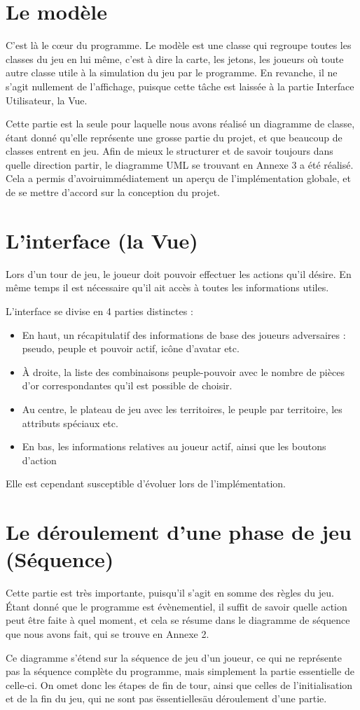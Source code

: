 \documentclass[a4paper]{report}
\begin{document}
\section{Le modèle}
\par
C'est là le cœur du programme. Le modèle est une classe qui regroupe toutes les
classes du jeu en lui même, c'est à dire la carte, les jetons, les joueurs où
toute autre classe utile à la simulation du jeu par le programme.  En revanche, il ne s'agit
nullement de l'affichage, puisque cette tâche est laissée à la
partie Interface Utilisateur, la Vue.
\par
Cette partie est la seule pour laquelle nous avons réalisé un diagramme de
classe, étant donné qu'elle représente une grosse partie du projet, et que
beaucoup de classes entrent en jeu. Afin de mieux le structurer et de
savoir toujours dans quelle direction partir, le diagramme UML se trouvant en
Annexe 3 a été réalisé. Cela a permis d'avoiruimmédiatement un aperçu de
l'implémentation globale, et de se mettre d'accord sur la conception du projet.
\section{L'interface (la Vue)}
Lors d'un tour de jeu, le joueur doit pouvoir effectuer les actions qu'il désire. En même temps il est nécessaire qu'il ait accès à toutes les informations utiles.
\par
L'interface se divise en 4 parties distinctes :
\begin{itemize}
\item En haut, un récapitulatif des informations de base des joueurs adversaires : pseudo, peuple et pouvoir actif, icône d'avatar etc.
\item À droite, la liste des combinaisons peuple-pouvoir avec le nombre de pièces d'or correspondantes qu'il est possible de choisir.
\item Au centre, le plateau de jeu avec les territoires, le peuple par territoire, les attributs spéciaux etc.
\item En bas, les informations relatives au joueur actif, ainsi que les boutons d'action
\end{itemize}
Elle est cependant susceptible d'évoluer lors de l'implémentation.
\section{Le déroulement d'une phase de jeu (Séquence)}
\par
Cette partie est très importante, puisqu'il s'agit en somme des règles du jeu.
Étant donné que le programme est évènementiel, il suffit de savoir
quelle action peut être faite à quel moment, et cela se résume dans le
diagramme de séquence que nous avons fait, qui se trouve en Annexe 2.
\par
Ce diagramme s'étend sur la séquence de jeu d'un joueur, ce qui ne
représente pas la séquence complète du programme, mais simplement la partie
essentielle de celle-ci. On omet donc les étapes de fin de tour, ainsi que celles
de l'initialisation et de la fin du jeu, qui ne sont pas \"essentielles\" au déroulement
d'une partie.
\newpage
\end{document}
